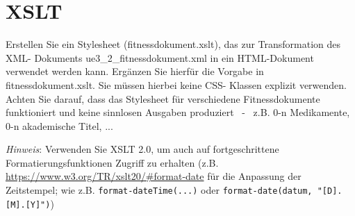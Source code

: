 \documentclass[a4paper,11pt]{report}
\begin{document}
\chapter{XSLT}

Erstellen Sie ein Stylesheet (fitnessdokument.xslt), das zur Transformation des XML-
Dokuments ue3\_2\_fitnessdokument.xml in ein HTML-Dokument verwendet werden kann.
Ergänzen Sie hierfür die Vorgabe in fitnessdokument.xslt. Sie müssen hierbei keine CSS-
Klassen explizit verwenden. Achten Sie darauf, dass das Stylesheet für verschiedene
Fitnessdokumente funktioniert und keine sinnlosen Ausgaben produziert ~-~ z.B. 0-n Medikamente,
0-n akademische Titel, ...

\textit{Hinweis}: Verwenden Sie XSLT 2.0, um auch auf fortgeschrittene Formatierungsfunktionen Zugriff zu erhalten 
(z.B. \href{https://www.w3.org/TR/xslt20/#format-date}{https://www.w3.org/TR/xslt20/\#format-date} 
für die Anpassung der Zeitstempel; wie z.B. \texttt{format-dateTime(...)} oder \texttt{format-date(datum, "[D].[M].[Y]")})
\end{document}
